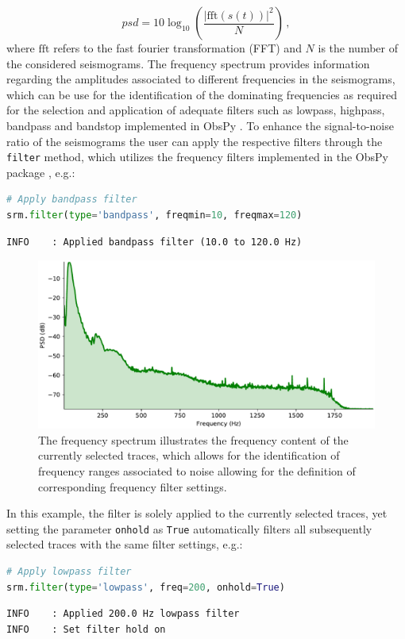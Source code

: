 \documentclass[a4paper,fleqn]{cas-sc}
\begin{document}
\begin{equation}
	psd=10\log_{10}\left(\frac{\lvert \textrm{fft}\left(s\left(t\right)\right)\rvert^2}{N}\right)\,,
\end{equation}
where $\textrm{fft}$ refers to the fast fourier transformation (FFT) and $N$ is the number of the considered seismograms.
The frequency spectrum provides information regarding the amplitudes associated to different frequencies in the seismograms, which can be use for the identification of the dominating frequencies as required for the selection and application of adequate filters such as lowpass, highpass, bandpass and bandstop implemented in ObsPy \citep{beyreuther2010}.
To enhance the signal-to-noise ratio of the seismograms the user can apply the respective filters through the \texttt{filter} method, which utilizes the frequency filters implemented in the ObsPy package \citep[lowpass, highpass, bandpass and bandstop;][]{beyreuther2010}, e.g.:
\begin{lstlisting}[language=Python, firstnumber=14]
# Apply bandpass filter
srm.filter(type='bandpass', freqmin=10, freqmax=120)
\end{lstlisting}
\begin{footnotesize}
\begin{verbatim}
INFO    : Applied bandpass filter (10.0 to 120.0 Hz)
\end{verbatim}
\end{footnotesize}
\begin{figure}
	\centering
	\includegraphics[width=.75\textwidth]{figures/spectrum.pdf}
	\caption{The frequency spectrum illustrates the frequency content of the currently selected traces, which allows for the identification of frequency ranges associated to noise allowing for the definition of corresponding frequency filter settings.}
	\label{fig:spectrum}
\end{figure}
In this example, the filter is solely applied to the currently selected traces, yet setting the parameter \texttt{onhold} as \texttt{True} automatically filters all subsequently selected traces with the same filter settings, e.g.:
\begin{lstlisting}[language=Python, firstnumber=16]
# Apply lowpass filter
srm.filter(type='lowpass', freq=200, onhold=True)
\end{lstlisting}
\begin{footnotesize}
\begin{verbatim}
INFO    : Applied 200.0 Hz lowpass filter
INFO    : Set filter hold on
\end{verbatim}
\end{footnotesize}
\end{document}
